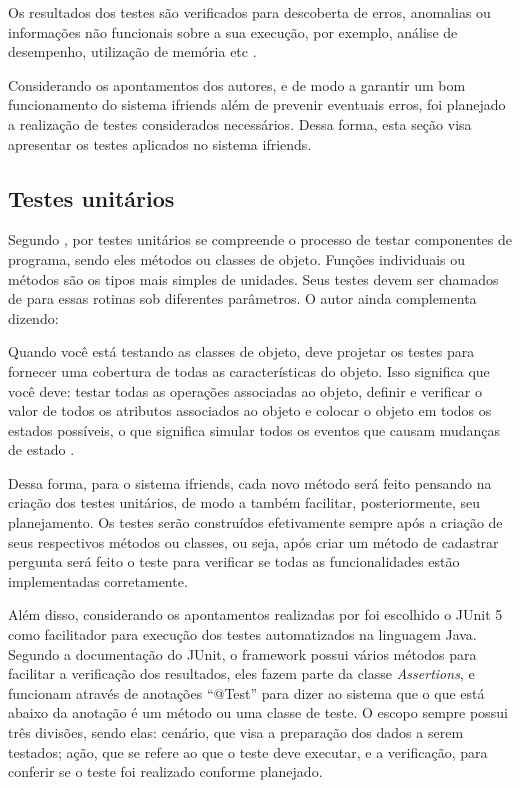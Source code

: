 \begin{citacao}
Os resultados dos testes são verificados para descoberta de erros, anomalias ou informações não funcionais sobre a sua execução, por exemplo, análise de desempenho, utilização de memória etc \cite{Polo:2020}.
\end{citacao}

Considerando os apontamentos dos autores, e de modo a garantir um bom funcionamento do sistema \gls{ifriends} além de prevenir eventuais erros, foi planejado a realização de testes considerados necessários. Dessa forma, esta seção visa apresentar os testes aplicados no sistema \gls{ifriends}.

\subsection{Testes unitários}
Segundo , por testes unitários se compreende o processo de testar componentes de programa, sendo eles métodos ou classes de objeto. Funções individuais ou métodos são os tipos mais simples de unidades. Seus testes devem ser chamados de para essas rotinas sob diferentes parâmetros. O autor ainda complementa dizendo: 

\begin{citacao}
Quando você está testando as classes de objeto, deve projetar os testes para fornecer uma cobertura de todas as características do objeto. Isso significa que você deve: testar todas as operações associadas ao objeto, definir e verificar o valor de todos os atributos associados ao objeto e colocar o objeto em todos os estados possíveis, o que significa simular todos os eventos que causam mudanças de estado
\cite{SOMMERVILLE:2011}.
\end{citacao}

Dessa forma, para o sistema \gls{ifriends}, cada novo método será feito pensando na criação dos testes unitários, de modo a também facilitar, posteriormente, seu planejamento. Os testes serão construídos efetivamente sempre após a criação de seus respectivos métodos ou classes, ou seja, após criar um método de cadastrar pergunta será feito o teste para verificar se todas as funcionalidades estão implementadas corretamente.

Além disso, considerando os apontamentos realizadas por  foi escolhido o \gls{JUnit} 5 como facilitador para execução dos testes automatizados na linguagem Java. Segundo a documentação do \gls{JUnit}, o \gls{framework} possui vários métodos para facilitar a verificação dos resultados, eles fazem parte da classe \textit{Assertions}, e funcionam através de anotações ``@Test'' para dizer ao sistema que o que está abaixo da anotação é um método ou uma classe de teste. O escopo sempre possui três divisões, sendo elas: cenário, que visa a preparação dos dados a serem testados; ação, que se refere ao que o teste deve executar, e a verificação, para conferir se o teste foi realizado conforme planejado.

